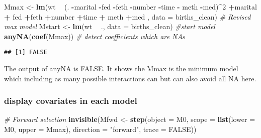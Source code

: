 \documentclass[]{article}
\newenvironment{Shaded}{\begin{snugshade}}{\end{snugshade}}
\newcommand{\KeywordTok}[1]{\textcolor[rgb]{0.13,0.29,0.53}{\textbf{#1}}}
\newcommand{\DataTypeTok}[1]{\textcolor[rgb]{0.13,0.29,0.53}{#1}}
\newcommand{\DecValTok}[1]{\textcolor[rgb]{0.00,0.00,0.81}{#1}}
\newcommand{\StringTok}[1]{\textcolor[rgb]{0.31,0.60,0.02}{#1}}
\newcommand{\CommentTok}[1]{\textcolor[rgb]{0.56,0.35,0.01}{\textit{#1}}}
\newcommand{\OtherTok}[1]{\textcolor[rgb]{0.56,0.35,0.01}{#1}}
\newcommand{\OperatorTok}[1]{\textcolor[rgb]{0.81,0.36,0.00}{\textbf{#1}}}
\newcommand{\NormalTok}[1]{#1}
\begin{document}
\begin{Shaded}
\begin{Highlighting}[]
\NormalTok{Mmax <-}\StringTok{ }\KeywordTok{lm}\NormalTok{(wt }\OperatorTok{~}\StringTok{ }\NormalTok{(. }\OperatorTok{-}\NormalTok{marital }\OperatorTok{-}\NormalTok{fed }\OperatorTok{-}\NormalTok{feth }\OperatorTok{-}\NormalTok{number }\OperatorTok{-}\NormalTok{time }\OperatorTok{-}\StringTok{ }\NormalTok{meth }\OperatorTok{-}\NormalTok{med)}\OperatorTok{^}\DecValTok{2} 
           \OperatorTok{+}\NormalTok{marital }\OperatorTok{+}\StringTok{ }\NormalTok{fed }\OperatorTok{+}\NormalTok{feth }\OperatorTok{+}\NormalTok{number }\OperatorTok{+}\NormalTok{time }\OperatorTok{+}\StringTok{ }\NormalTok{meth }\OperatorTok{+}\NormalTok{med , }\DataTypeTok{data =}\NormalTok{ births_clean) }\CommentTok{# Revised max model}
\NormalTok{Mstart <-}\StringTok{ }\KeywordTok{lm}\NormalTok{(wt }\OperatorTok{~}\StringTok{ }\NormalTok{., }\DataTypeTok{data =}\NormalTok{ births_clean) }\CommentTok{#start model}
\KeywordTok{anyNA}\NormalTok{(}\KeywordTok{coef}\NormalTok{(Mmax)) }\CommentTok{# detect coefficients which are NAs}
\end{Highlighting}
\end{Shaded}

\begin{verbatim}
## [1] FALSE
\end{verbatim}

The output of anyNA is FALSE. It shows the Mmax is the minimum model
which including as many possible interactions can but can also avoid all
NA here.

\subsubsection{display covariates in each
model}\label{display-covariates-in-each-model}

\begin{Shaded}
\begin{Highlighting}[]
\CommentTok{# Forward selection}
\KeywordTok{invisible}\NormalTok{(Mfwd <-}\StringTok{ }\KeywordTok{step}\NormalTok{(}\DataTypeTok{object =}\NormalTok{ M0,}
               \DataTypeTok{scope =} \KeywordTok{list}\NormalTok{(}\DataTypeTok{lower =}\NormalTok{ M0, }\DataTypeTok{upper =}\NormalTok{ Mmax),}
               \DataTypeTok{direction =} \StringTok{"forward"}\NormalTok{, }\DataTypeTok{trace =} \OtherTok{FALSE}\NormalTok{))}
\end{Highlighting}
\end{Shaded}
\end{document}
